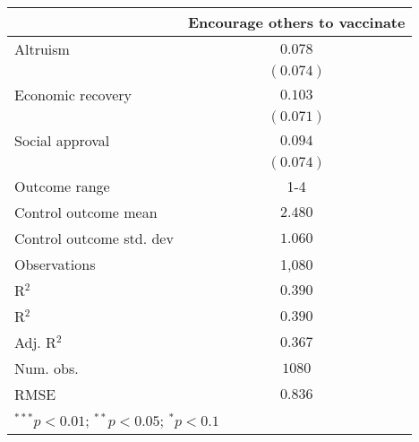 
\begin{table}
\begin{center}
\begin{tabular}{l c}
\hline
 & Encourage others to vaccinate \\
\hline
Altruism                 & $0.078$   \\
                         & $(0.074)$ \\
Economic recovery        & $0.103$   \\
                         & $(0.071)$ \\
Social approval          & $0.094$   \\
                         & $(0.074)$ \\
\hline
Outcome range            & 1-4       \\
Control outcome mean     & $2.480$   \\
Control outcome std. dev & $1.060$   \\
Observations             & 1,080     \\
R$^{2}$                  & $0.390$   \\
R$^2$                    & $0.390$   \\
Adj. R$^2$               & $0.367$   \\
Num. obs.                & $1080$    \\
RMSE                     & $0.836$   \\
\hline
\multicolumn{2}{l}{\scriptsize{$^{***}p<0.01$; $^{**}p<0.05$; $^{*}p<0.1$}}
\end{tabular}
\caption{}
\label{table:Tables and Figures/SI_table23_motiv_Chile_encourage1-4}
\end{center}
\end{table}
